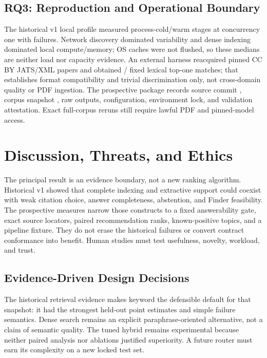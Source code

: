 \documentclass[conference,letterpaper]{IEEEtran}
\begin{document}
\subsection{RQ3: Reproduction and Operational Boundary}
The historical v1 local profile measured \PaperPerformanceStageCount{} process-cold/warm stages at concurrency one with \PaperPerformanceFailedSamples{} failures. Network discovery dominated variability and dense indexing dominated local compute/memory; OS caches were not flushed, so these medians are neither load nor capacity evidence. An external harness reacquired \PaperExternalDocumentCount{} pinned CC BY JATS/XML papers and obtained \PaperExternalTopOneCount{}/\PaperExternalDocumentCount{} fixed lexical top-one matches; that establishes format compatibility and trivial discrimination only, not cross-domain quality or PDF ingestion. The prospective package records source commit \texttt{\VTwoEvaluationSourceCommitPrefix{}}, corpus snapshot \texttt{\VTwoCorpusSnapshotId{}}, raw outputs, configuration, environment lock, and validation attestation. Exact full-corpus reruns still require lawful PDF and pinned-model access.

\section{Discussion, Threats, and Ethics}
The principal result is an evidence boundary, not a new ranking algorithm. Historical v1 showed that complete indexing and extractive support could coexist with weak citation choice, answer completeness, abstention, and Finder feasibility. The prospective measures narrow those constructs to a fixed answerability gate, exact source locators, paired recommendation ranks, known-positive topics, and a pipeline fixture. They do not erase the historical failures or convert contract conformance into benefit. Human studies must test usefulness, novelty, workload, and trust.

\subsection{Evidence-Driven Design Decisions}
The historical retrieval evidence makes keyword the defensible default for that snapshot: it had the strongest held-out point estimates and simple failure semantics. Dense search remains an explicit paraphrase-oriented alternative, not a claim of semantic quality. The tuned hybrid remains experimental because neither paired analysis nor ablations justified superiority. A future router must earn its complexity on a new locked test set.
\end{document}
